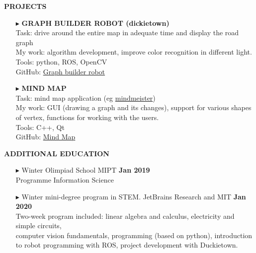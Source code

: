 \documentclass[a4paper,10pt]{article}
\begin{document}
	\colorbox{magicmint}{
		\begin{minipage}{0.96\textwidth}
			\textbf{PROJECTS}
		\end{minipage}
	}
	\begin{itemize}
	
		\item[$\blacktriangleright$] \textbf{GRAPH BUILDER ROBOT (dickietown)}\\
		Task: drive around the entire map in adequate time and display the road graph\\
		My  work: algorithm development, improve color recognition in different light. \\
		Tools: python, ROS, OpenCV\\
		GitHub: \href{https://github.com/Kira5005-code/template-ros-core} {Graph builder robot}
		\item[$\blacktriangleright$] \textbf{MIND MAP}\\
		Task: mind map application (eg \href{https://www.mindmeister.com} {mindmeister})\\
		My work: GUI (drawing a graph and its changes), support for various shapes of vertex, functions for working with the users. \\
		Tools: C++, Qt\\
		GitHub: \href{https://github.com/Kira5005-code/Mind-Map} {Mind Map}
		
	\end{itemize}

	\colorbox{magicmint}{
		\begin{minipage}{0.96\textwidth}
			\textbf{ADDITIONAL EDUCATION}
		\end{minipage}
	}
	
	\begin{itemize}
		\item[$\blacktriangleright$]  Winter Olimpiad School MIPT \hspace{10.4cm}\textbf{Jan 2019} \\ Programme Information Science 
		\item[$\blacktriangleright$]  Winter mini-degree program in STEM. JetBrains Research and MIT \hspace{4.7cm}\textbf{Jan 2020} \\ 
		Two-week program included: linear algebra and calculus, electricity and simple circuits,\\ computer vision fundamentals, programming (based on python), introduction to robot programming with ROS, project development with Duckietown.
	\end{itemize}
	
\end{document}
